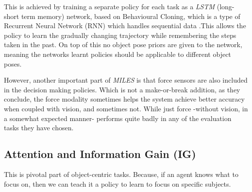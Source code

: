 This is achieved by training a separate policy for each task as a \emph{LSTM} (long-short term memory) network, based on Behavioural Cloning, which is a type of Recurrent Neural Network (RNN) which handles sequential data \cite{medsker2001recurrent}.This allows the policy to learn the gradually changing trajectory while remembering the steps taken in the past. On top of this no object pose priors are given to the network, meaning the networks learnt policies should be applicable to different object poses.

However, another important part of \emph{MILES} is that force sensors are also included in the decision making policies. Which is not a make-or-break addition, as they conclude, the force modality sometimes helps the system achieve better accuracy when coupled with vision, and sometimes not. While just force -without vision, in a somewhat expected manner- performs quite badly in any of the evaluation tasks they have chosen. 




\subsection{Attention and Information Gain (IG)}
This is pivotal part of object-centric tasks. Because, if an agent knows what to focus on, then we can teach it a policy to learn to focus on specific subjects.

